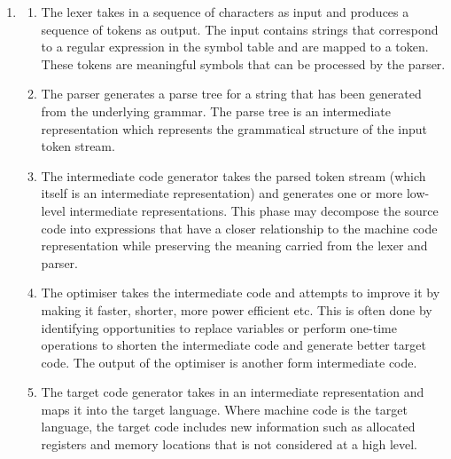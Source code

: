 \documentclass[a4paper, 12pt, oneside]{book}
\begin{document}
\begin{enumerate}
  \item
    \begin{enumerate}
      \item
        The lexer takes in a sequence of characters as input and produces a sequence of tokens as output. The input contains strings that correspond to a regular expression in the symbol table and are mapped to a token. These tokens are meaningful symbols that can be processed by the parser.

      \item
        The parser generates a parse tree for a string that has been generated from the underlying grammar. The parse tree is an intermediate representation which represents the grammatical structure of the input token stream.

      \item
        The intermediate code generator takes the parsed token stream (which itself is an intermediate representation) and generates one or more low-level intermediate representations. This phase may decompose the source code into expressions that have a closer relationship to the machine code representation while preserving the meaning carried from the lexer and parser.

      \item
        The optimiser takes the intermediate code and attempts to improve it by making it faster, shorter, more power efficient etc. This is often done by identifying opportunities to replace variables or perform one-time operations to shorten the intermediate code and generate better target code. The output of the optimiser is another form intermediate code.

      \item
        The target code generator takes in an intermediate representation and maps it into the target language. Where machine code is the target language, the target code includes new information such as allocated registers and memory locations that is not considered at a high level.\\
    \end{enumerate}


\end{enumerate}
\end{document}
